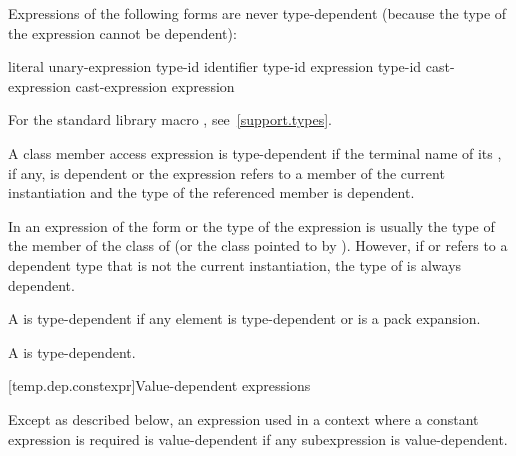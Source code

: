 \pnum
Expressions of the following forms are never type-dependent (because the type
of the expression cannot be dependent):

\begin{ncsimplebnf}
literal\br
{} unary-expression\br
{} \terminal{(} type-id \terminal{)}\br
{}  \terminal{(} identifier \terminal{)}\br
{} \terminal{(} type-id \terminal{)}\br
{} \terminal{(} expression \terminal{)}\br
{} \terminal{(} type-id \terminal{)}\br
\opt{\terminal{::}}  cast-expression\br
\opt{\terminal{::}}  \terminal{[} \terminal{]} cast-expression\br
{} \br
{} \terminal{(} expression \terminal{)}
\end{ncsimplebnf}

\begin{note}
For the standard library macro ,
see~\ref{support.types}.
\end{note}

\pnum
A class member access expression is
type-dependent if
the terminal name of its , if any, is dependent or
the expression refers to a member of the current instantiation and
the type of the referenced member is dependent.
\begin{note}
In an expression of the form
or
the type of the expression is usually the type of the member
of the class of
(or the class pointed to by
).
However, if
or
refers to a dependent type that is not the current instantiation,
the type of
is always dependent.
\end{note}

\pnum
A  is type-dependent if any element is
type-dependent or is a pack expansion.

\pnum
A  is type-dependent.

[temp.dep.constexpr]{Value-dependent expressions}

\pnum
Except as described below, an expression used in a context where a
constant expression is required is value-dependent if any
subexpression is value-dependent.

